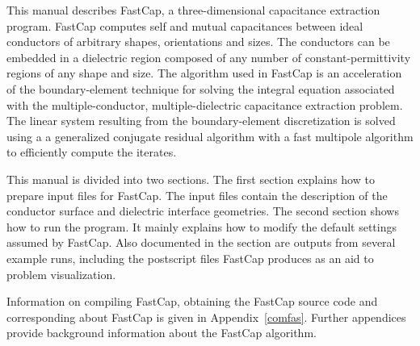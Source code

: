 This manual describes FastCap, a three-dimensional capacitance
extraction program.  FastCap computes self and mutual capacitances
between ideal conductors of
arbitrary shapes, orientations and sizes.  
The conductors can be embedded in a dielectric
region composed of any number of constant-permittivity regions of any shape and
size.
The algorithm used in
FastCap is an acceleration of the boundary-element technique for
solving the integral equation associated with the multiple-conductor,
multiple-dielectric
capacitance extraction problem.  
The linear system resulting  from the boundary-element discretization
is solved using a
a generalized conjugate
residual algorithm with a fast multipole algorithm to efficiently
compute the iterates.

This manual is divided into two sections.  The first section explains
how to prepare input files for FastCap.  The input files contain the
description of the conductor surface and dielectric interface geometries.  
The second section shows how to run the program.
It mainly explains how to modify the default settings assumed by
FastCap.  Also documented in the section are outputs from several
example runs, including the postscript files FastCap produces as
an aid to problem visualization.

Information on compiling FastCap, obtaining the FastCap source code and 
corresponding about FastCap is given in
Appendix~\ref{comfas}. Further appendices provide background information
about the FastCap algorithm.


